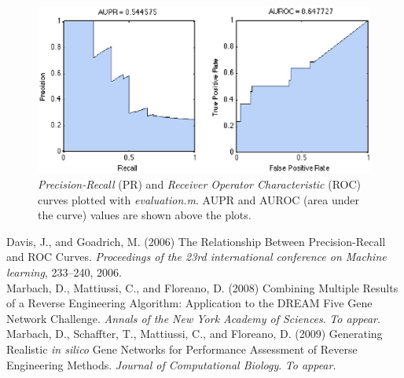 \documentclass{llncs}
\begin{document}
\begin{figure}[tbh]
\label{PR-ROC}
\centering\includegraphics[width=\textwidth]{figures/PR-ROC}
\caption{\emph{Precision-Recall} (PR) and \emph{Receiver Operator Characteristic} (ROC) curves plotted with \emph{evaluation.m}. AUPR and AUROC (area under the curve) values are shown above the plots.}
\end{figure}




\pagebreak
\small
\begin{thebibliography}{}

\addvspace{6pt}
Davis, J., and Goadrich, M. (2006) The Relationship Between Precision-Recall and ROC Curves. \emph{Proceedings of the 23rd international conference on Machine learning}, 233--240, 2006.\\

Marbach, D., Mattiussi, C., and Floreano, D. (2008) Combining Multiple Results of a Reverse Engineering Algorithm: Application to the DREAM Five Gene Network Challenge. \emph{Annals of the New York Academy of Sciences}. \emph{To appear}.\\

Marbach, D., Schaffter, T., Mattiussi, C., and Floreano, D. (2009) Generating Realistic \emph{in silico} Gene Networks for Performance Assessment of Reverse Engineering Methods. \emph{Journal of Computational Biology}. \emph{To appear}.\\

\end{thebibliography}
\end{document}
